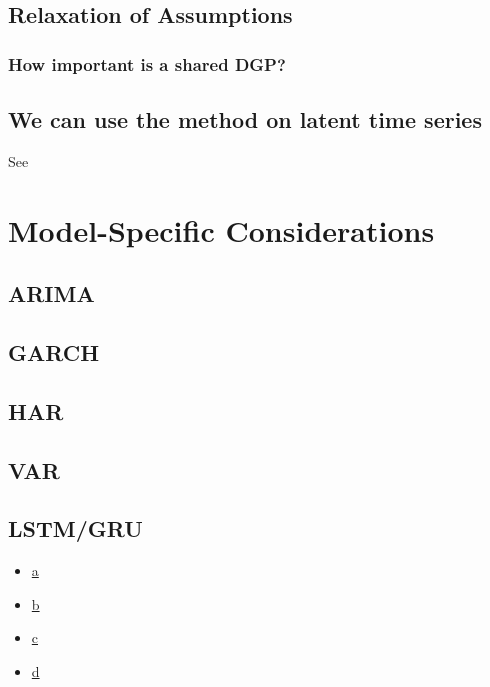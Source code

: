 \documentclass[11pt]{article}
\theoremstyle{definition}
\begin{document}
\subsection{Relaxation of Assumptions}
\subsubsection{How important is a shared DGP?}

\subsection{We can use the method on latent time series}
See \cite{lundquist2024volatility}

\section{Model-Specific Considerations}

\subsection{ARIMA}
\cite{lin2021minimizing}
\subsection{GARCH}
\subsection{HAR}
\subsection{VAR}

\subsection{LSTM/GRU}

\begin{itemize}
  \item \href{https://www.r-bloggers.com/2021/04/lstm-network-in-r/#google_vignette}{a}
  \item \href{https://sharmasaravanan.medium.com/an-implementation-guide-for-lstm-in-r-2347e4118a2c}{b}
  \item \href{https://search.r-project.org/CRAN/refmans/TSdeeplearning/html/GRU_ts.html}{c}
  \item \href{https://medium.com/codex/time-series-prediction-using-lstm-in-python-19b1187f580f#:~:text=In%20conclusion%2C%20LSTM%20models%20are,in%20your%20data%20science%20toolkit.}{d}
\end{itemize}
\end{document}
